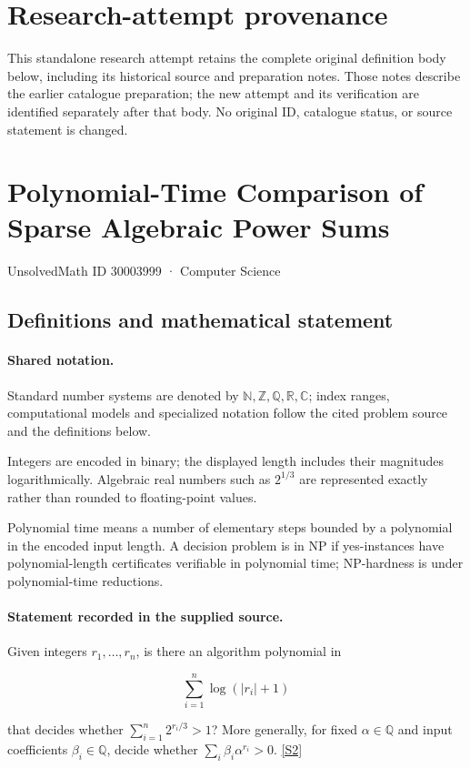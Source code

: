 \documentclass[11pt]{article}
\begin{document}
\section*{Research-attempt provenance}
This standalone research attempt retains the complete original definition body below,
including its historical source and preparation notes. Those notes describe the
earlier catalogue preparation; the new attempt and its verification are identified
separately after that body. No original ID, catalogue status, or source statement is changed.

\section{Polynomial-Time Comparison of Sparse Algebraic Power Sums}\label{30003999}
{\small UnsolvedMath ID 30003999 · Computer Science}
\subsection{Definitions and mathematical statement}

\paragraph{Shared notation.}Standard number systems are denoted by $\mathbb N,\mathbb Z,\mathbb Q,\mathbb R,\mathbb C$; index ranges, computational models and specialized notation follow the cited problem source and the definitions below.


Integers are encoded in binary; the displayed length includes their magnitudes logarithmically. Algebraic real numbers such as $2^{1/3}$ are represented exactly rather than rounded to floating-point values.

Polynomial time means a number of elementary steps bounded by a polynomial in the encoded input length. A decision problem is in $\mathrm{NP}$ if yes-instances have polynomial-length certificates verifiable in polynomial time; NP-hardness is under polynomial-time reductions.
\paragraph{Statement recorded in the supplied source.}
Given integers $r_1,\ldots,r_n$, is there an algorithm polynomial in

$$\sum_{i=1}^n\log(\lvert r_i\rvert+1)$$

that decides whether $\sum_{i=1}^n2^{r_i/3}>1$? More generally, for fixed $\alpha\in\mathbb Q$ and input coefficients $\beta_i\in\mathbb Q$, decide whether $\sum_i\beta_i\alpha^{r_i}>0$. \href{https://doi.org/10.4171/owr/2018/50}{[S2]}
\end{document}
